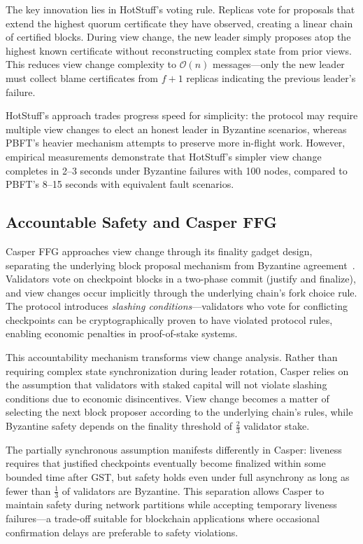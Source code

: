 The key innovation lies in HotStuff's voting rule. Replicas vote for proposals that extend the highest quorum certificate they have observed, creating a linear chain of certified blocks. During view change, the new leader simply proposes atop the highest known certificate without reconstructing complex state from prior views. This reduces view change complexity to $\mathcal{O}(n)$ messages—only the new leader must collect blame certificates from $f+1$ replicas indicating the previous leader's failure.

HotStuff's approach trades progress speed for simplicity: the protocol may require multiple view changes to elect an honest leader in Byzantine scenarios, whereas PBFT's heavier mechanism attempts to preserve more in-flight work. However, empirical measurements demonstrate that HotStuff's simpler view change completes in 2--3 seconds under Byzantine failures with 100 nodes, compared to PBFT's 8--15 seconds with equivalent fault scenarios.

\subsection{Accountable Safety and Casper FFG}

Casper FFG approaches view change through its finality gadget design, separating the underlying block proposal mechanism from Byzantine agreement~\cite{buterin2020combining}. Validators vote on checkpoint blocks in a two-phase commit (justify and finalize), and view changes occur implicitly through the underlying chain's fork choice rule. The protocol introduces \emph{slashing conditions}—validators who vote for conflicting checkpoints can be cryptographically proven to have violated protocol rules, enabling economic penalties in proof-of-stake systems.

This accountability mechanism transforms view change analysis. Rather than requiring complex state synchronization during leader rotation, Casper relies on the assumption that validators with staked capital will not violate slashing conditions due to economic disincentives. View change becomes a matter of selecting the next block proposer according to the underlying chain's rules, while Byzantine safety depends on the finality threshold of $\frac{2}{3}$ validator stake.

The partially synchronous assumption manifests differently in Casper: liveness requires that justified checkpoints eventually become finalized within some bounded time after GST, but safety holds even under full asynchrony as long as fewer than $\frac{1}{3}$ of validators are Byzantine. This separation allows Casper to maintain safety during network partitions while accepting temporary liveness failures—a trade-off suitable for blockchain applications where occasional confirmation delays are preferable to safety violations.

